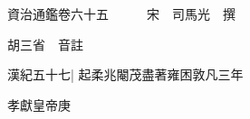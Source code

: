 






























































資治通鑑卷六十五　　　宋　司馬光　撰

胡三省　音註

漢紀五十七|{
	起柔兆閹茂盡著雍困敦凡三年}


孝獻皇帝庚

